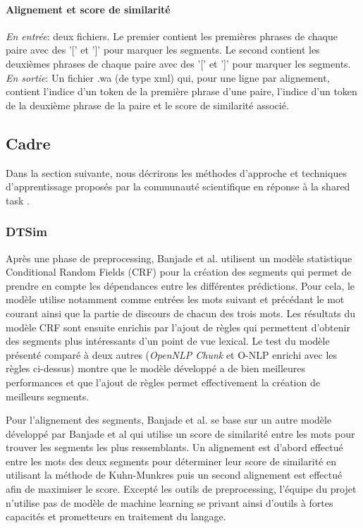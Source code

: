 \documentclass[a4paper, twoside, 11pt]{article}
\begin{document}
 \paragraph{Alignement et score de similarité}
    \hfill \break
    \textit{En entrée}: deux fichiers. Le premier contient les premières phrases de chaque paire avec des '[' et ']' pour marquer les segments. Le second contient les deuxièmes phrases de chaque paire avec des '[' et ']' pour marquer les segments. \hfill \break
    \textit{En sortie}: Un fichier .wa (de type xml) qui, pour une ligne par alignement, contient l'indice d'un token de la première phrase d'une paire, l'indice d'un token de la deuxième phrase de la paire et le score de similarité associé.

    \subsection{Cadre}

    Dans la section suivante, nous décrirons les méthodes d'approche et techniques d'apprentissage proposés par la communauté scientifique en réponse à la \og shared task \fg{}.

        \subsubsection{DTSim}

        Après une phase de preprocessing, Banjade et al. \cite{banjade} utilisent un modèle statistique Conditional Random Fields (CRF) pour la création des segments qui permet de prendre en compte les dépendances entre les différentes prédictions. Pour cela, le modèle utilise notamment comme entrées les mots suivant et précédant le mot courant ainsi que la partie de discours de chacun des trois mots.
Les résultats du modèle CRF sont ensuite enrichis par l'ajout de règles qui permettent d'obtenir des segments plus intéressants d'un point de vue lexical. Le test du modèle présenté comparé à deux autres (\textit{OpenNLP Chunk} et O-NLP enrichi avec les règles ci-dessus) montre que le modèle développé a de bien meilleures performances et que l'ajout de règles permet effectivement la création de meilleurs segments.

 Pour l'alignement des segments, Banjade et al. se base sur un autre modèle développé par Banjade et al \cite{banjadeautre} qui utilise un score de similarité entre les mots pour trouver les segments les plus ressemblants. Un alignement est d'abord effectué entre les mots des deux segments pour déterminer leur score de similarité en utilisant la méthode de Kuhn-Munkres puis un second alignement est effectué afin de maximiser le score. Excepté les outils de preprocessing, l'équipe du projet n'utilise pas de modèle de machine learning se privant ainsi d'outils à fortes capacités et prometteurs en traitement du langage.
\end{document}
